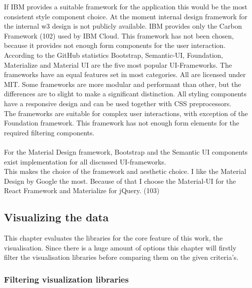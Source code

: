 \documentclass[american,a4paper,oneside,,tablecaptionabove]{scrbook}
\begin{document}
If IBM provides a suitable framework for the application this would be
the most consistent style component choice. At the moment internal
design framework for the internal w3 design is not publicly available.
IBM provides only the Carbon Framework (102) used by IBM Cloud. This
framework has not been chosen, because it provides not enough form
components for the user interaction. According to the GitHub statistics
Bootstrap, Semantic-UI, Foundation, Materialize and Material UI are the
five most popular UI-Frameworks. The frameworks have an equal features
set in most categories. All are licensed under MIT. Some frameworks are
more modular and performant than other, but the differences are to
slight to make a significant distinction. All styling components have a
responsive design and can be used together with CSS preprocessors.\\
The frameworks are suitable for complex user interactions, with
exception of the Foundation framework. This framework has not enough
form elements for the required filtering components.\\
\\
For the Material Design framework, Bootstrap and the Semantic UI
components exist implementation for all discussed UI-frameworks.\\
This makes the choice of the framework and aesthetic choice. I like the
Material Design by Google the most. Because of that I choose the
Material-UI for the React Framework and Materialize for jQuery. (103)

\subsection{Visualizing the data}\label{visualizing-the-data}

This chapter evaluates the libraries for the core feature of this work,
the visualisation. Since there is a huge amount of options this chapter
will firstly filter the visualisation libraries before comparing them on
the given criteria's.

\subsubsection{Filtering visualization
libraries}\label{filtering-visualization-libraries}
\end{document}
